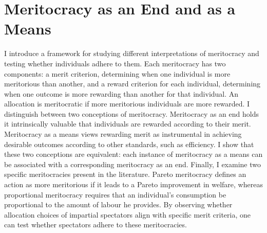\renewcommand{\thefootnote}{\fnsymbol{footnote}}

\chapter[Meritocracy as an End and as a Means]%
        {Meritocracy as an End and as a Means\protect\footnotemark}
		\label{ch:meritocracy}


\setcounter{footnote}{0}
\renewcommand{\thefootnote}{\arabic{footnote}}

\begin{chapterabstract}
	I introduce a framework for studying different interpretations of meritocracy and testing whether individuals adhere to them. Each meritocracy has two components: a merit criterion, determining when one individual is more meritorious than another, and a reward criterion for each individual, determining when one outcome is more rewarding than another for that individual. An allocation is meritocratic if more meritorious individuals are more rewarded. I distinguish between two conceptions of meritocracy. Meritocracy as an end holds it intrinsically valuable that individuals are rewarded according to their merit. Meritocracy as a means views rewarding merit as instrumental in achieving desirable outcomes according to other standards, such as efficiency. I show that these two conceptions are equivalent: each instance of meritocracy as a means can be associated with a corresponding meritocracy as an end. Finally, I examine two specific meritocracies present in the literature. Pareto meritocracy defines an action as more meritorious if it leads to a Pareto improvement in welfare, whereas proportional meritocracy requires that an individual’s consumption be proportional to the amount of labour he provides. By observing whether allocation choices of impartial spectators align with specific merit criteria, one can test whether spectators adhere to these meritocracies.
\end{chapterabstract}


